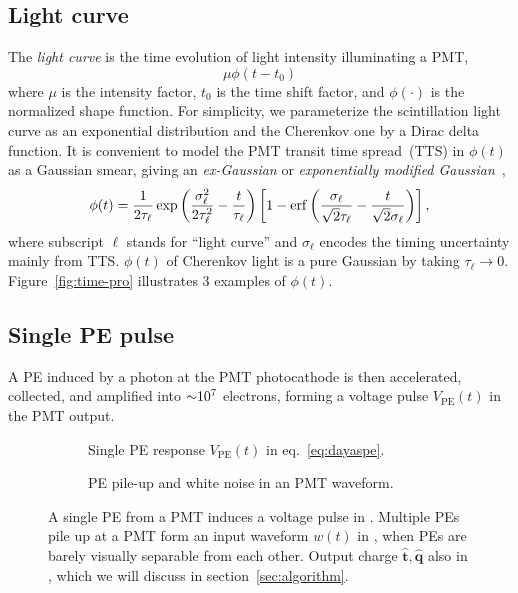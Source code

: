 \subsection{Light curve}
The \textit{light curve} is the time evolution of light intensity illuminating a PMT,
\begin{equation}
  \label{eq:light-curve}
  \mu\phi(t-t_0)
\end{equation}
where $\mu$ is the intensity factor, $t_0$ is the time shift factor, and $\phi(\cdot)$ is the normalized shape function. For simplicity, we parameterize the scintillation light curve as an exponential distribution and the Cherenkov one by a Dirac delta function.  It is convenient to model the PMT transit time spread~(TTS) in $\phi(t)$ as a Gaussian smear, giving an \textit{ex-Gaussian} or \textit{exponentially modified Gaussian}~\cite{li_separation_2016},
\begin{align}
    \phi(t) = \frac{1}{2\tau_\ell} \exp\left(\frac{\sigma_\ell^2}{2\tau_\ell^2}-\frac{t}{\tau_\ell}\right) \left[1 - \operatorname{erf}\left( \frac{\sigma_\ell}{\sqrt{2}\tau_\ell} - \frac{t}{\sqrt{2}\sigma_\ell} \right)\right],
    \label{eq:time-pro}
\end{align}
where subscript $\ell$ stands for ``light curve'' and $\sigma_\ell$ encodes the timing uncertainty mainly from TTS. $\phi(t)$ of Cherenkov light is a pure Gaussian by taking $\tau_\ell \rightarrow 0$. Figure~\ref{fig:time-pro} illustrates 3 examples of $\phi(t)$. 


\subsection{Single PE pulse}
\label{subsec:spe}

A PE induced by a photon at the PMT photocathode is then accelerated, collected, and amplified into $\num[retain-unity-mantissa=false]{\sim 1e7}$ electrons, forming a voltage pulse $V_\mathrm{PE}(t)$ in the PMT output.
\begin{figure}[H]
  \begin{subfigure}{.49\textwidth}
    \centering
    \resizebox{\textwidth}{!}{}
    \caption{\label{fig:spe} Single PE response $V_\mathrm{PE}(t)$ in eq.~\eqref{eq:dayaspe}.}
  \end{subfigure}
  \begin{subfigure}{.49\textwidth}
    \centering
    \resizebox{\textwidth}{!}{}
    \caption{\label{fig:pile} PE pile-up and white noise in an PMT waveform.}
  \end{subfigure}
  \caption{A single PE from a PMT induces a voltage pulse in . Multiple PEs pile up at a PMT form an input waveform $w(t)$ in , when PEs are barely visually separable from each other. Output charge $\hat{\bm{t}}, \hat{\bm{q}}$ also in , which we will discuss in section~\ref{sec:algorithm}. }
\end{figure}

